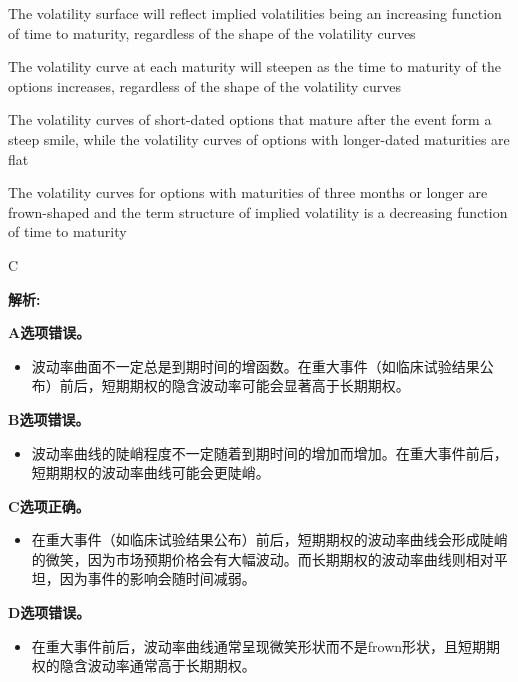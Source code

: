 \documentclass{article}
\newenvironment{explanation}
{\textbf{解析:}\par}
{\par}
\begin{document}
\begin{choices}
    \item The volatility surface will reflect implied volatilities being an increasing function of time to maturity, regardless of the shape of the volatility curves
    \item The volatility curve at each maturity will steepen as the time to maturity of the options increases, regardless of the shape of the volatility curves
    \item The volatility curves of short-dated options that mature after the event form a steep smile, while the volatility curves of options with longer-dated maturities are flat
    \item The volatility curves for options with maturities of three months or longer are frown-shaped and the term structure of implied volatility is a decreasing function of time to maturity
\end{choices}

\begin{correctanswer}
    C
\end{correctanswer}

\begin{explanation}
    \textbf{A选项错误。}
    \begin{itemize}
        \item 波动率曲面不一定总是到期时间的增函数。在重大事件（如临床试验结果公布）前后，短期期权的隐含波动率可能会显著高于长期期权。
    \end{itemize}
    
    \textbf{B选项错误。}
    \begin{itemize}
        \item 波动率曲线的陡峭程度不一定随着到期时间的增加而增加。在重大事件前后，短期期权的波动率曲线可能会更陡峭。
    \end{itemize}
    
    \textbf{C选项正确。}
    \begin{itemize}
        \item 在重大事件（如临床试验结果公布）前后，短期期权的波动率曲线会形成陡峭的微笑，因为市场预期价格会有大幅波动。而长期期权的波动率曲线则相对平坦，因为事件的影响会随时间减弱。
    \end{itemize}
    
    \textbf{D选项错误。}
    \begin{itemize}
        \item 在重大事件前后，波动率曲线通常呈现微笑形状而不是frown形状，且短期期权的隐含波动率通常高于长期期权。
    \end{itemize}
\end{explanation}
\end{document}
